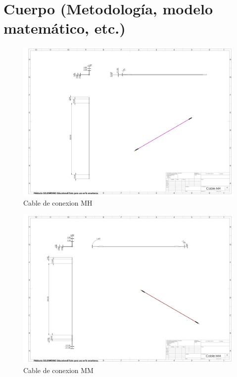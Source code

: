    \section{Cuerpo (Metodología, modelo matemático, etc.)}
    \begin{figure}[H]
        \centering
    \includegraphics[trim = {10mm 10mm 10mm 10mm},clip,scale=0.120]{24/Img/cabledeConexionmh.PDF}
        \caption{Cable de conexion MH}
        \label{fig:Cable de conexion MH}
    \end{figure}
    \begin{figure}[H]
        \centering
        \includegraphics[trim = {10mm 10mm 10mm 10mm},clip,scale=0.120]{24/Img/cabledeConexionmm.pdf}
        \caption{Cable de conexion MM}
        \label{fig:Cable de conexion MM}
    \end{figure}
